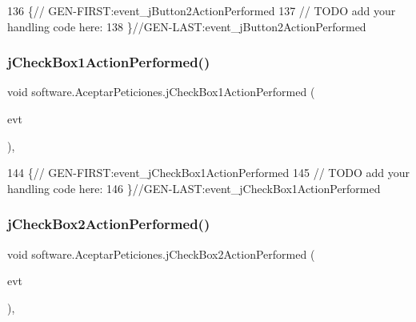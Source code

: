 \begin{DoxyCode}
136                                                                          \{\textcolor{comment}{//
      GEN-FIRST:event\_jButton2ActionPerformed}
137         \textcolor{comment}{// TODO add your handling code here:}
138     \}\textcolor{comment}{//GEN-LAST:event\_jButton2ActionPerformed}
\end{DoxyCode}
\mbox{\label{classsoftware_1_1_aceptar_peticiones_a290ec180fd67647791d5ae0c9868b588}} 
\subsubsection{\texorpdfstring{j\+Check\+Box1\+Action\+Performed()}{jCheckBox1ActionPerformed()}}
{\footnotesize\ttfamily void software.\+Aceptar\+Peticiones.\+j\+Check\+Box1\+Action\+Performed (\begin{DoxyParamCaption}\item[{java.\+awt.\+event.\+Action\+Event}]{evt }\end{DoxyParamCaption})\hspace{0.3cm}{\ttfamily [inline]}, {\ttfamily [private]}}


\begin{DoxyCode}
144                                                                            \{\textcolor{comment}{//
      GEN-FIRST:event\_jCheckBox1ActionPerformed}
145         \textcolor{comment}{// TODO add your handling code here:}
146     \}\textcolor{comment}{//GEN-LAST:event\_jCheckBox1ActionPerformed}
\end{DoxyCode}
\mbox{\label{classsoftware_1_1_aceptar_peticiones_ae615808bf27e05f1c9368e352141520e}} 
\subsubsection{\texorpdfstring{j\+Check\+Box2\+Action\+Performed()}{jCheckBox2ActionPerformed()}}
{\footnotesize\ttfamily void software.\+Aceptar\+Peticiones.\+j\+Check\+Box2\+Action\+Performed (\begin{DoxyParamCaption}\item[{java.\+awt.\+event.\+Action\+Event}]{evt }\end{DoxyParamCaption})\hspace{0.3cm}{\ttfamily [inline]}, {\ttfamily [private]}}


